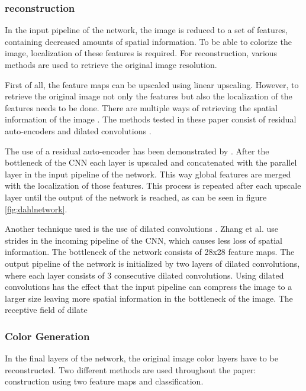 \subsubsection{reconstruction}
In the input pipeline of the network, the image is reduced to a set of features, containing decreased amounts of spatial information. To be able to colorize the image, localization of these features is required. For reconstruction, various methods are used to retrieve the original image resolution.

First of all, the feature maps can be upscaled using linear upscaling. However, to retrieve the original image not only the features but also the localization of the features needs to be done. There are multiple ways of retrieving the spatial information of the image \cite{Charpiat} \cite{Zhang}. The methods tested in these paper consist of residual auto-encoders and dilated convolutions \cite{yu2015multi}.

The use of a residual auto-encoder has been demonstrated by \cite{Dahl}. After the bottleneck of the CNN each layer is upscaled and concatenated with the parallel layer in the input pipeline of the network. This way global features are merged with the localization of those features. This process is repeated after each upscale layer until the output of the network is reached, as can be seen in figure \ref{fig:dahlnetwork}.

%
Another technique used is the use of dilated convolutions \cite{yu2015multi}. Zhang et al. use strides in the incoming pipeline of the CNN, which causes less loss of spatial information. The bottleneck of the network consists of 28x28 feature maps. The output pipeline of the network is initialized by two layers of dilated convolutions, where each layer consists of 3 consecutive dilated convolutions. Using dilated convolutions has the effect that the input pipeline can compress the image to a larger size leaving more spatial information in the bottleneck of the image. The receptive field of dilate


\subsubsection{Color Generation}
In the final layers of the network, the original image color layers have to be reconstructed. Two different methods are used throughout the paper: construction using two feature maps and classification.

